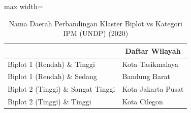 \begin{table}[H]
\centering
\caption{Nama Daerah Perbandingan Klaster Biplot vs Kategori IPM (UNDP) (2020)} \label{tab:sample1crossname2020}
\begin{adjustbox}{max width=\textwidth}
\begin{tabular}{|>{\centering\arraybackslash}p{4cm}|p{10cm}|}
\hline
\multicolumn{1}{|c|}{\textbf{Kategori}} & \multicolumn{1}{c|}{\textbf{Daftar Wilayah}} \\
\hline
Biplot 1 (Rendah) \& Tinggi & Kota Tasikmalaya \\
\hline
Biplot 1 (Rendah) \& Sedang & Bandung Barat \\
\hline
Biplot 2 (Tinggi) \& Sangat Tinggi & Kota Jakarta Pusat \\
\hline
Biplot 2 (Tinggi) \& Tinggi & Kota Cilegon \\
\hline
\end{tabular}
\end{adjustbox}
\end{table}